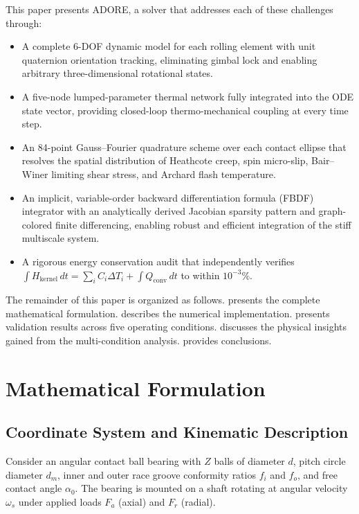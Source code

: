 \documentclass[preprint,12pt]{elsarticle}
\begin{document}
This paper presents ADORE, a solver that addresses each of these challenges through:
\begin{itemize}
    \item A complete 6-DOF dynamic model for each rolling element with unit quaternion orientation tracking, eliminating gimbal lock and enabling arbitrary three-dimensional rotational states.
    \item A five-node lumped-parameter thermal network fully integrated into the ODE state vector, providing closed-loop thermo-mechanical coupling at every time step.
    \item An 84-point Gauss--Fourier quadrature scheme over each contact ellipse that resolves the spatial distribution of Heathcote creep, spin micro-slip, Bair--Winer limiting shear stress, and Archard flash temperature.
    \item An implicit, variable-order backward differentiation formula (FBDF) integrator with an analytically derived Jacobian sparsity pattern and graph-colored finite differencing, enabling robust and efficient integration of the stiff multiscale system.
    \item A rigorous energy conservation audit that independently verifies $\int H_{\text{kernel}}\,dt = \sum_i C_i \Delta T_i + \int Q_{\text{conv}}\,dt$ to within $10^{-3}\%$.
\end{itemize}

The remainder of this paper is organized as follows.  presents the complete mathematical formulation.  describes the numerical implementation.  presents validation results across five operating conditions.  discusses the physical insights gained from the multi-condition analysis.  provides conclusions.


\section{Mathematical Formulation}
\label{sec:model}

\subsection{Coordinate System and Kinematic Description}
\label{sec:kinematics}

Consider an angular contact ball bearing with $Z$ balls of diameter $d$, pitch circle diameter $d_m$, inner and outer race groove conformity ratios $f_i$ and $f_o$, and free contact angle $\alpha_0$. The bearing is mounted on a shaft rotating at angular velocity $\omega_s$ under applied loads $F_a$ (axial) and $F_r$ (radial).
\end{document}

